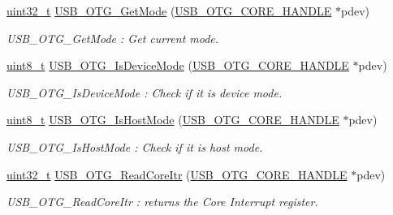 \begin{DoxyCompactItemize}
\hyperlink{stdint_8h_a435d1572bf3f880d55459d9805097f62}{uint32\-\_\-t} \hyperlink{group___u_s_b___c_o_r_e___private___functions_gadc0c08bc4072271e843b69f1101f8c09}{U\-S\-B\-\_\-\-O\-T\-G\-\_\-\-Get\-Mode} (\hyperlink{group___u_s_b___c_o_r_e___exported___types_gaf76054c11eb8a3367907aad7ae700e80}{U\-S\-B\-\_\-\-O\-T\-G\-\_\-\-C\-O\-R\-E\-\_\-\-H\-A\-N\-D\-L\-E} $\ast$pdev)
\begin{DoxyCompactList}\small\item\em U\-S\-B\-\_\-\-O\-T\-G\-\_\-\-Get\-Mode \-: Get current mode. \end{DoxyCompactList}\item 
\hyperlink{stdint_8h_aba7bc1797add20fe3efdf37ced1182c5}{uint8\-\_\-t} \hyperlink{group___u_s_b___c_o_r_e___private___functions_ga0cc90949f3d178e3b9d98e8d3e98b799}{U\-S\-B\-\_\-\-O\-T\-G\-\_\-\-Is\-Device\-Mode} (\hyperlink{group___u_s_b___c_o_r_e___exported___types_gaf76054c11eb8a3367907aad7ae700e80}{U\-S\-B\-\_\-\-O\-T\-G\-\_\-\-C\-O\-R\-E\-\_\-\-H\-A\-N\-D\-L\-E} $\ast$pdev)
\begin{DoxyCompactList}\small\item\em U\-S\-B\-\_\-\-O\-T\-G\-\_\-\-Is\-Device\-Mode \-: Check if it is device mode. \end{DoxyCompactList}\item 
\hyperlink{stdint_8h_aba7bc1797add20fe3efdf37ced1182c5}{uint8\-\_\-t} \hyperlink{group___u_s_b___c_o_r_e___private___functions_ga821f94371b342fe2feaedca5d8c023cf}{U\-S\-B\-\_\-\-O\-T\-G\-\_\-\-Is\-Host\-Mode} (\hyperlink{group___u_s_b___c_o_r_e___exported___types_gaf76054c11eb8a3367907aad7ae700e80}{U\-S\-B\-\_\-\-O\-T\-G\-\_\-\-C\-O\-R\-E\-\_\-\-H\-A\-N\-D\-L\-E} $\ast$pdev)
\begin{DoxyCompactList}\small\item\em U\-S\-B\-\_\-\-O\-T\-G\-\_\-\-Is\-Host\-Mode \-: Check if it is host mode. \end{DoxyCompactList}\item 
\hyperlink{stdint_8h_a435d1572bf3f880d55459d9805097f62}{uint32\-\_\-t} \hyperlink{group___u_s_b___c_o_r_e___private___functions_ga178eb6ecc4c0514842c9bbb7ee783d21}{U\-S\-B\-\_\-\-O\-T\-G\-\_\-\-Read\-Core\-Itr} (\hyperlink{group___u_s_b___c_o_r_e___exported___types_gaf76054c11eb8a3367907aad7ae700e80}{U\-S\-B\-\_\-\-O\-T\-G\-\_\-\-C\-O\-R\-E\-\_\-\-H\-A\-N\-D\-L\-E} $\ast$pdev)
\begin{DoxyCompactList}\small\item\em U\-S\-B\-\_\-\-O\-T\-G\-\_\-\-Read\-Core\-Itr \-: returns the Core Interrupt register. \end{DoxyCompactList}\item 

\end{DoxyCompactItemize}
